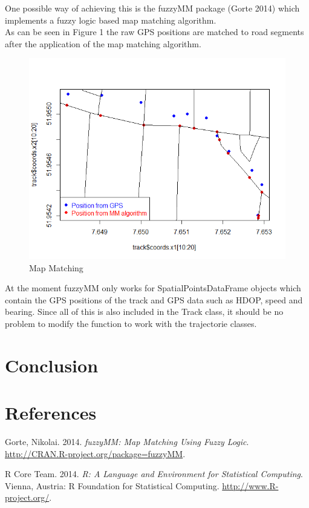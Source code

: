 \documentclass[]{article}
\begin{document}
One possible way of achieving this is the fuzzyMM package (Gorte 2014)
which implements a fuzzy logic based map matching algorithm.\\As can be
seen in Figure 1 the raw GPS positions are matched to road segments
after the application of the map matching algorithm.

\begin{figure}[htbp]
\centering
\includegraphics{figures/urban.png}
\caption{Map Matching}
\end{figure}

At the moment fuzzyMM only works for SpatialPointsDataFrame objects
which contain the GPS positions of the track and GPS data such as HDOP,
speed and bearing. Since all of this is also included in the Track
class, it should be no problem to modify the function to work with the
trajectorie classes.

\section{Conclusion}\label{conclusion}

\section*{References}\label{references}

Gorte, Nikolai. 2014. \emph{fuzzyMM: Map Matching Using Fuzzy Logic}.
\url{http://CRAN.R-project.org/package=fuzzyMM}.

R Core Team. 2014. \emph{R: A Language and Environment for Statistical
Computing}. Vienna, Austria: R Foundation for Statistical Computing.
\url{http://www.R-project.org/}.
\end{document}
